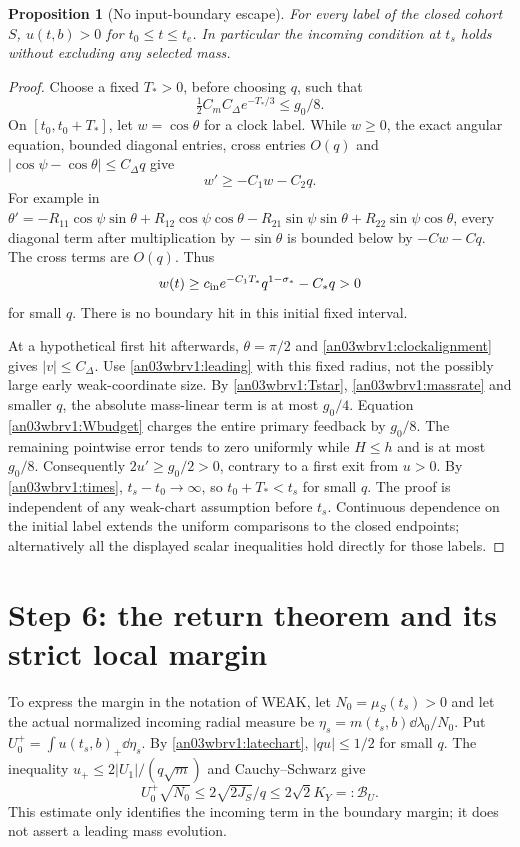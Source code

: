 \documentclass[11pt]{article}
\numberwithin{equation}{section}
\newtheorem{proposition}[theorem]{Proposition}
\theoremstyle{remark}\newtheorem{remark}[theorem]{Remark}
\begin{document}
\begin{proposition}[No input-boundary escape]
\label{an03wbrv1:nocross}
For every label of the closed cohort $S$,
$u(t,b)>0$ for $t_0\le t\le t_e$. In particular the incoming
condition at $t_s$ holds without excluding any selected mass.
\end{proposition}
\begin{proof}
Choose a fixed $T_*>0$, before choosing $q$, such that
\begin{equation}
 \tfrac12 C_m C_\Delta e^{-T_*/3}\le g_0/8.
 \label{an03wbrv1:Tstar}
\end{equation}
On $[t_0,t_0+T_*]$, let $w=\cos\theta$ for a clock label.
While $w\ge0$, the exact angular equation, bounded diagonal
entries, cross entries $O(q)$ and
$|\cos\psi-\cos\theta|\le C_\Delta q$ give
\[
 w'\ge-C_1w-C_2q.
\]
For example in
$\theta'=-R_{11}\cos\psi\sin\theta+
R_{12}\cos\psi\cos\theta-R_{21}\sin\psi\sin\theta+
R_{22}\sin\psi\cos\theta$, every diagonal term after
multiplication by $-\sin\theta$ is bounded below by
$-Cw-Cq$. The cross terms are $O(q)$. Thus
\[
 w(t)\ge c_{\rm in}e^{-C_1T_*}q^{1-\sigma_*}-C_*q>0
\]
for small $q$. There is no boundary hit in this initial fixed interval.

At a hypothetical first hit afterwards, $\theta=\pi/2$ and
\eqref{an03wbrv1:clockalignment} gives $|v|\le C_\Delta$.
Use \eqref{an03wbrv1:leading} with this fixed radius, not the
possibly large early weak-coordinate size. By
\eqref{an03wbrv1:Tstar}, \eqref{an03wbrv1:massrate} and smaller
$q$, the absolute mass-linear term is at most $g_0/4$.
Equation \eqref{an03wbrv1:Wbudget} charges the entire primary
feedback by $g_0/8$. The remaining pointwise error tends to zero
uniformly while $H\le h$ and is at most $g_0/8$. Consequently
$2u'\ge g_0/2>0$, contrary to a first exit from $u>0$.
By \eqref{an03wbrv1:times}, $t_s-t_0\to\infty$, so $t_0+T_*<t_s$
for small $q$. The proof is independent of any weak-chart assumption
before $t_s$. Continuous dependence on the initial label extends the
uniform comparisons to the closed endpoints; alternatively all the
displayed scalar inequalities hold directly for those labels.
\end{proof}

\section{Step 6: the return theorem and its strict local margin}
To express the margin in the notation of WEAK, let
$N_0=\mu_S(t_s)>0$ and let the actual normalized incoming radial
measure be $\eta_s=m(t_s,b)\dd\lambda_0/N_0$. Put
$U_0^+=\int u(t_s,b)_+\dd\eta_s$. By
\eqref{an03wbrv1:latechart}, $|qu|\le1/2$ for small $q$.
The inequality $u_+\le2|U_1|/(q\sqrt m)$ and Cauchy--Schwarz give
\begin{equation}
 U_0^+\sqrt{N_0}\le 2\sqrt{2J_S}/q\le 2\sqrt2 K_Y=:\mathcal B_U.
 \label{an03wbrv1:incomingmoment}
\end{equation}
This estimate only identifies the incoming term in the boundary
margin; it does not assert a leading mass evolution.
\end{document}
